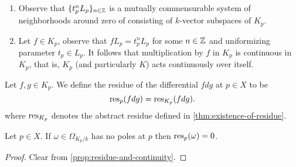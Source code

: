 \begin{remark}\label{rem:mutually-commensurable-system}
\begin{enumerate}[label = (\alph*)]
	\item Observe that $\{t_{p}^{n}L_{p}\}_{n\in {\mathbb Z}}$ is a mutually commensurable system of neighborhoods around zero of consisting of $k$-vector subspaces of $K_{p}$. 
	\item Let $f\in K_{p}$, observe that $fL_{p} = t_{p}^{n}L_{p}$ for some $n \in {\mathbb Z}$ and uniformizing parameter $t_{p} \in L_{p}$. It follows that multiplication by $f$ in $K_{p}$ is continuous in $K_{p}$, that is, $K_{p}$ (and particularly $K$) acts continuously over itself.
\end{enumerate}
\end{remark}

\begin{definition}\label{def:residue-at-p}
	Let $f,g \in K_{p}$. We define the residue of the differential $fdg$ at $p\in X$ to be
	\[
		\operatorname{res}_{p}(fdg) = \operatorname{res}_{K_{p}}(fdg).
	\]
	where $\operatorname{res}_{K_{p}}$ denotes the abstract residue defined in \cref{thm:existence-of-residue}.
\end{definition} 
\begin{proposition}\label{prop:no-poles-zero-residue}
	Let $p\in X$. If $\omega \in \Omega_{K_{p}/k}$ has no poles at $p$ then $\operatorname{res}_{p}(\omega) = 0$.
\end{proposition}
\begin{proof}
	Clear from \cref{prop:residue-and-continuity}.
\end{proof}

